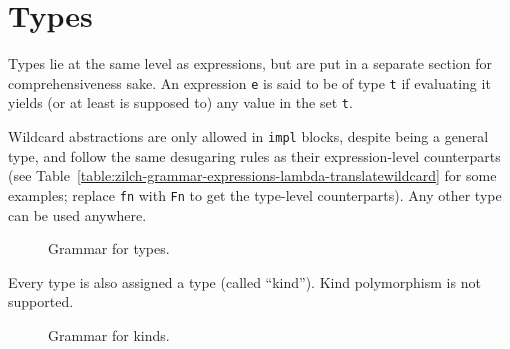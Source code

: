\section{Types}\label{sec:zilch-grammr-types}

Types lie at the same level as expressions, but are put in a separate section for comprehensiveness sake.
An expression \verb|e| is said to be of type \verb|t| if evaluating it yields (or at least is supposed to) any value in the set \verb|t|.

Wildcard abstractions are only allowed in \verb|impl| blocks, despite being a general type, and follow the same desugaring rules as their expression-level counterparts (see Table~\ref{table:zilch-grammar-expressions-lambda-translatewildcard} for some examples; replace \verb|fn| with \verb|Fn| to get the type-level counterparts).
Any other type can be used anywhere.

\begin{figure}[H]
  \centering


  \caption{Grammar for types.}
  \label{fig:zilch-grammar-types-grammar}
\end{figure}

Every type is also assigned a type (called ``kind'').
Kind polymorphism is not supported.

\begin{figure}[H]
  \centering


  \caption{Grammar for kinds.}
  \label{fig:zilch-grammar-types-kindgrammar}
\end{figure}

